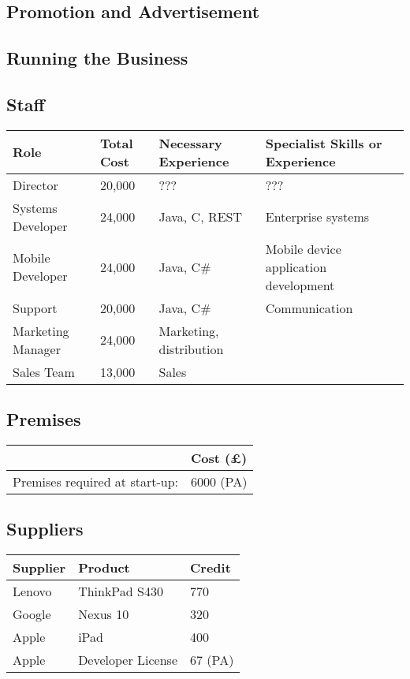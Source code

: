 \documentclass[DIV=calc, paper=a4, fontsize=11pt]{scrartcl}	 %
\begin{document}
\subsection{Promotion and Advertisement}

\subsection{Running the Business}

\subsection{Staff}
\begin{tabular}{|l|l|l|l|}\hline
Role              & Total Cost & Necessary Experience & Specialist Skills or Experience \\ \hline
Director          & 20,000     & ???                     & ??? \\ \hline
Systems Developer & 24,000     & Java, C, REST           & Enterprise systems \\ \hline
Mobile Developer  & 24,000     & Java, C\#               & Mobile device application development \\ \hline
Support           & 20,000     & Java, C\#               & Communication \\ \hline
Marketing Manager & 24,000     & Marketing, distribution & \\ \hline
Sales Team        & 13,000     & Sales                   & \\ \hline
\end{tabular}

\subsection{Premises}
\begin{tabular}{|l|l|} \hline
                               & Cost (\pounds) \\ \hline
Premises required at start-up: & 6000 (PA)      \\ \hline
\end{tabular}

\subsection{Suppliers}
\begin{tabular}{|l|l|l|} \hline
Supplier & Product       & Credit \\ \hline
Lenovo   & ThinkPad S430 & 770 \\ \hline
Google   & Nexus 10      & 320 \\ \hline
Apple    & iPad          & 400 \\ \hline
Apple    & Developer License & 67 (PA) \\ \hline
\end{tabular}
\end{document}
